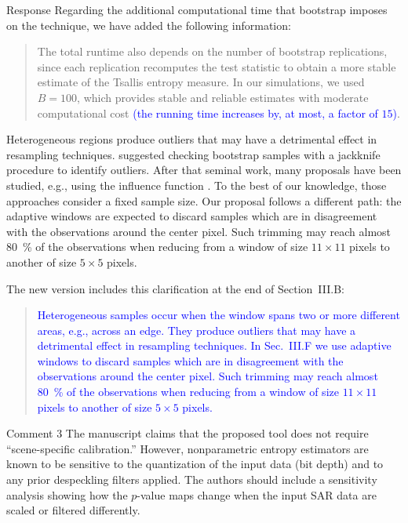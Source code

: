 \documentclass[11pt]{report}
\begin{document}
\begin{responsebox}{Response}
Regarding the additional computational time that bootstrap imposes on the technique, we have added the following information:
\begin{quote}
The total runtime also depends on the number of bootstrap replications, since each replication recomputes the test statistic to obtain a more stable estimate of the Tsallis entropy measure. In our simulations, we used $B=100$, which provides stable and reliable estimates with moderate computational cost \textcolor{blue}{(the running time increases by, at most, a factor of $15$)}. 
\end{quote}

Heterogeneous regions produce outliers that may have a detrimental effect in resampling techniques.
\citet{JackknifeAfterBootstrapStandardErrorsandInfluenceFunctions} suggested checking bootstrap samples with a jackknife procedure to identify outliers.
After that seminal work, many proposals have been studied, e.g., using the influence function \citep{RobustBootstrapwithNonRandomWeightsBasedontheInfluenceFunction}.
To the best of our knowledge, those approaches consider a fixed sample size.
Our proposal follows a different path: the adaptive windows are expected to discard samples which are in disagreement with the observations around the center pixel.
Such trimming may reach almost \SI{80}{\percent} of the observations when reducing from a window of size $11\times11$ pixels to another of size $5\times5$ pixels.

The new version includes this clarification at the end of Section~III.B:
\begin{quote}
\textcolor{blue}{Heterogeneous samples occur when the window spans two or more different areas, 
e.g., across an edge.
They produce outliers that may have a detrimental effect in resampling techniques.
In Sec.~III.F we use adaptive windows to discard samples which are in disagreement with the observations around the center pixel.
Such trimming may reach almost \SI{80}{\percent} of the observations when reducing from a window of size $11\times11$ pixels to another of size $5\times5$ pixels.
}
\end{quote}

\end{responsebox}

\vspace{1em}

\begin{reviewbox}{Comment 3}
The manuscript claims that the proposed tool does not require ``scene-specific calibration.'' However, nonparametric entropy estimators are known to be sensitive to the quantization of the input data (bit depth) and to any prior despeckling filters applied. The authors should include a sensitivity analysis showing how the $p$-value maps change when the input SAR data are scaled or filtered differently.
\end{reviewbox}
\end{document}
